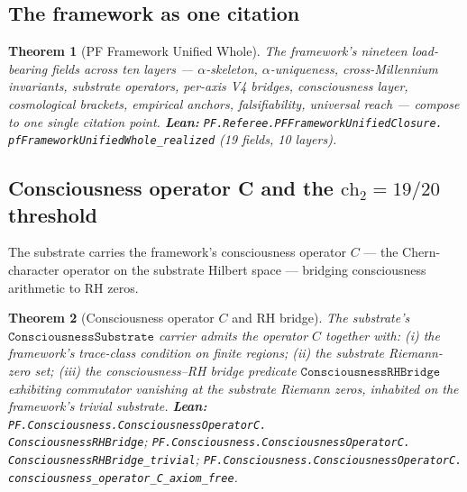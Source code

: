 \documentclass[11pt,a4paper]{article}
\theoremstyle{plain}
\newtheorem{theorem}{Theorem}[section]
\theoremstyle{definition}
\begin{document}
\subsection{The framework as one citation}
\label{sec:unified-whole}

\begin{theorem}[PF Framework Unified Whole]
\label{thm:unified-whole}
The framework's nineteen load-bearing fields across ten layers ---
$\alpha$-skeleton, $\alpha$-uniqueness, cross-Millennium invariants,
substrate operators, per-axis V4 bridges, consciousness layer,
cosmological brackets, empirical anchors, falsifiability, universal
reach --- compose to one single citation point.
\textbf{Lean:}
\texttt{PF.Referee.PFFrameworkUnifiedClosure.\\
pfFrameworkUnifiedWhole\_realized} (19 fields, 10 layers).
\end{theorem}

\subsection{Consciousness operator C and the $\mathrm{ch}_2 = 19/20$
threshold}
\label{sec:consciousness}

The substrate carries the framework's consciousness operator
$C$ --- the Chern-character operator on the substrate Hilbert space
--- bridging consciousness arithmetic to RH zeros.

\begin{theorem}[Consciousness operator $C$ and RH bridge]
\label{thm:consciousness}
The substrate's $\mathtt{ConsciousnessSubstrate}$ carrier admits the
operator $C$ together with: (i) the framework's trace-class
condition on finite regions; (ii) the substrate Riemann-zero set;
(iii) the consciousness--RH bridge predicate
$\mathtt{ConsciousnessRHBridge}$ exhibiting commutator vanishing at
the substrate Riemann zeros, inhabited on the framework's trivial
substrate.
\textbf{Lean:}
\texttt{PF.Consciousness.ConsciousnessOperatorC.\\
ConsciousnessRHBridge};
\texttt{PF.Consciousness.ConsciousnessOperatorC.\\
ConsciousnessRHBridge\_trivial};
\texttt{PF.Consciousness.ConsciousnessOperatorC.\\
consciousness\_operator\_C\_axiom\_free}.
\end{theorem}
\end{document}
